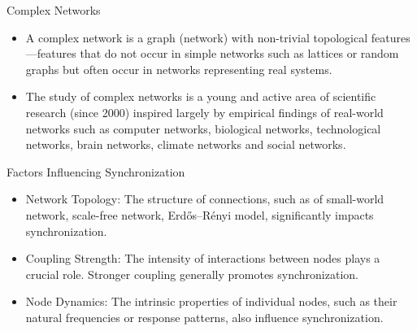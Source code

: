 \documentclass[notheorems, aspectratio=54]{beamer}
\begin{document}
\begin{frame}{Complex Networks}
  \begin{itemize}
    \item A complex network is a graph (network) with non-trivial topological features—features that do not occur in simple networks such as lattices or random graphs but often occur in networks representing real systems.
    \item  The study of complex networks is a young and active area of scientific research (since 2000) inspired largely by empirical findings of real-world networks such as computer networks, biological networks, technological networks, brain networks, climate networks and social networks.
  \end{itemize}
\end{frame}

\begin{frame}{Factors Influencing Synchronization}
  \begin{itemize}
    \item Network Topology: The structure of connections, such as of small-world network, scale-free network, Erdős–Rényi model, significantly impacts synchronization.
    \item Coupling Strength: The intensity of interactions between nodes plays a crucial role. Stronger coupling generally promotes synchronization.
    \item Node Dynamics: The intrinsic properties of individual nodes, such as their natural frequencies or response patterns, also influence synchronization.
  \end{itemize}
\end{frame}
\end{document}
